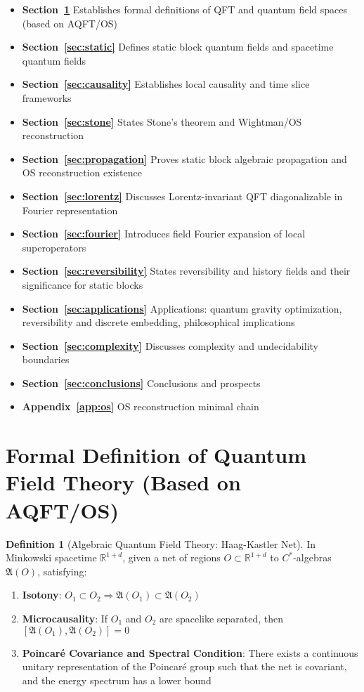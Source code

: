 \documentclass[11pt]{article}
\theoremstyle{definition}
\newtheorem{definition}[theorem]{Definition}
\theoremstyle{remark}
\begin{document}
\begin{itemize}
\item \textbf{Section~\ref{sec:formal}} Establishes formal definitions of QFT and quantum field spaces (based on AQFT/OS)
\item \textbf{Section~\ref{sec:static}} Defines static block quantum fields and spacetime quantum fields
\item \textbf{Section~\ref{sec:causality}} Establishes local causality and time slice frameworks
\item \textbf{Section~\ref{sec:stone}} States Stone's theorem and Wightman/OS reconstruction
\item \textbf{Section~\ref{sec:propagation}} Proves static block algebraic propagation and OS reconstruction existence
\item \textbf{Section~\ref{sec:lorentz}} Discusses Lorentz-invariant QFT diagonalizable in Fourier representation
\item \textbf{Section~\ref{sec:fourier}} Introduces field Fourier expansion of local superoperators
\item \textbf{Section~\ref{sec:reversibility}} States reversibility and history fields and their significance for static blocks
\item \textbf{Section~\ref{sec:applications}} Applications: quantum gravity optimization, reversibility and discrete embedding, philosophical implications
\item \textbf{Section~\ref{sec:complexity}} Discusses complexity and undecidability boundaries
\item \textbf{Section~\ref{sec:conclusions}} Conclusions and prospects
\item \textbf{Appendix~\ref{app:os}} OS reconstruction minimal chain
\end{itemize}

\section{Formal Definition of Quantum Field Theory (Based on AQFT/OS)}\label{sec:formal}

\begin{definition}[Algebraic Quantum Field Theory: Haag-Kastler Net]\label{def:aqft}
In Minkowski spacetime \( \mathbb{R}^{1+d} \), given a net of regions \( O \subset \mathbb{R}^{1+d} \) to \( C^* \)-algebras \( \mathfrak{A}(O) \), satisfying:
\begin{enumerate}
\item \textbf{Isotony}: \( O_1 \subset O_2 \Rightarrow \mathfrak{A}(O_1) \subset \mathfrak{A}(O_2) \)
\item \textbf{Microcausality}: If \( O_1 \) and \( O_2 \) are spacelike separated, then \( [\mathfrak{A}(O_1), \mathfrak{A}(O_2)] = 0 \)
\item \textbf{Poincaré Covariance and Spectral Condition}: There exists a continuous unitary representation of the Poincaré group such that the net is covariant, and the energy spectrum has a lower bound
\end{enumerate}
\end{definition}
\end{document}

